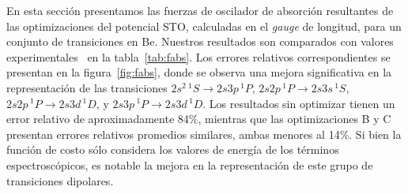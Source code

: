 En esta sección presentamos las fuerzas de oscilador de absorción 
resultantes de las optimizaciones del potencial STO, calculadas en el 
\textit{gauge} de longitud, para un conjunto de transiciones en Be. 
Nuestros resultados son comparados con valores experimentales~\cite{NIST} 
en la tabla~\ref{tab:fabs}. Los errores relativos correspondientes se 
presentan en la figura~\ref{fig:fabs}, donde se observa una mejora 
significativa en la representación de las transiciones 
$2s^2\,^1S\rightarrow 2s3p\,^1P$, $2s2p\,^1P\rightarrow 2s3s\,^1S$, 
$2s2p\,^1P\rightarrow 2s3d\,^1D$, y $2s3p\,^1P\rightarrow 2s3d\,^1D$.
Los resultados sin optimizar tienen un error relativo de aproximadamente  
84\%, mientras que las optimizaciones B y C presentan errores relativos 
promedios similares, ambas menores al 14\%. Si bien la función de costo
sólo considera los valores de energía de los términos espectroscópicos,
es notable la mejora en la representación de este grupo de transiciones 
dipolares.

